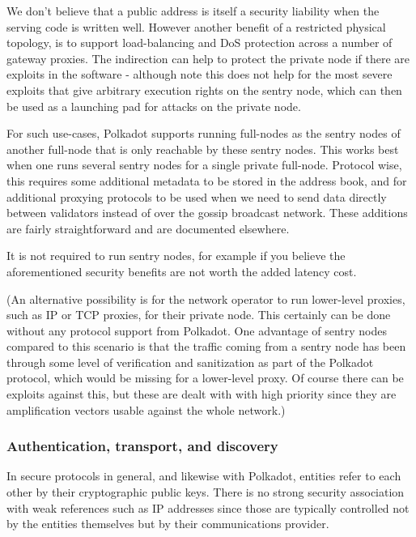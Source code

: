 We don't believe that a public address is itself a security liability when the
serving code is written well. However another benefit of a restricted physical
topology, is to support load-balancing and DoS protection across a number of
gateway proxies. The indirection can help to protect the private node if there
are exploits in the software - although note this does not help for the most
severe exploits that give arbitrary execution rights on the sentry node, which
can then be used as a launching pad for attacks on the private node.

For such use-cases, Polkadot supports running full-nodes as the sentry nodes of
another full-node that is only reachable by these sentry nodes. This works best
when one runs several sentry nodes for a single private full-node. Protocol
wise, this requires some additional metadata to be stored in the address book,
and for additional proxying protocols to be used when we need to send data
directly between validators instead of over the gossip broadcast network. These
additions are fairly straightforward and are documented elsewhere.

It is not required to run sentry nodes, for example if you believe the
aforementioned security benefits are not worth the added latency cost.

(An alternative possibility is for the network operator to run lower-level
proxies, such as IP or TCP proxies, for their private node. This certainly can
be done without any protocol support from Polkadot. One advantage of sentry
nodes compared to this scenario is that the traffic coming from a sentry node
has been through some level of verification and sanitization as part of the
Polkadot protocol, which would be missing for a lower-level proxy. Of course
there can be exploits against this, but these are dealt with with high priority
since they are amplification vectors usable against the whole network.)

\subsubsection{Authentication, transport, and discovery} \label{sec:net_lowlevel}

In secure protocols in general, and likewise with Polkadot, entities refer to each other by their cryptographic public keys. There is no strong security association with weak references such as IP addresses since those are typically controlled not by the entities themselves but by their communications provider.

